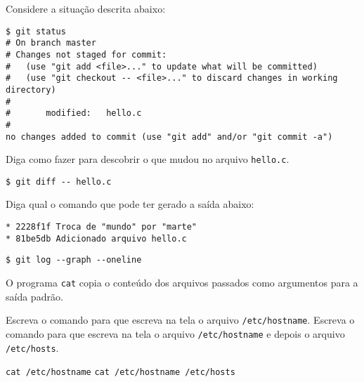 \begin{Exercise}[label={0012}, difficulty={0}, origin={git}]
  Considere a situação descrita abaixo:
  \begin{lstlisting}
$ git status
# On branch master
# Changes not staged for commit:
#   (use "git add <file>..." to update what will be committed)
#   (use "git checkout -- <file>..." to discard changes in working directory)
#
#       modified:   hello.c
#
no changes added to commit (use "git add" and/or "git commit -a")
  \end{lstlisting}
  Diga como fazer para descobrir o que mudou no arquivo \lstinline+hello.c+.
\end{Exercise}
\begin{Answer}[ref={0012}]
  \begin{lstlisting}
$ git diff -- hello.c
  \end{lstlisting}
\end{Answer}

\begin{Exercise}[label={0013}, difficulty={0}, origin={git}]
  Diga qual o comando que pode ter gerado a saída abaixo:
  \begin{lstlisting}
* 2228f1f Troca de "mundo" por "marte"
* 81be5db Adicionado arquivo hello.c
  \end{lstlisting}
\end{Exercise}
\begin{Answer}[ref={0013}]
  \begin{lstlisting}
$ git log --graph --oneline
  \end{lstlisting}
\end{Answer}

\begin{Exercise}[label={0014}, difficulty={0}, origin={coreutils}]
  O programa \lstinline+cat+ copia o conteúdo dos arquivos passados como
  argumentos para a saída padrão.

  \Question Escreva o comando para que escreva na tela o arquivo
  \lstinline+/etc/hostname+.
  \Question Escreva o comando para que escreva na tela o arquivo
  \lstinline+/etc/hostname+ e depois o arquivo \lstinline+/etc/hosts+.
\end{Exercise}
\begin{Answer}[ref={0014}]
  \Question \lstinline+cat /etc/hostname+
  \Question \lstinline+cat /etc/hostname /etc/hosts+
\end{Answer}

